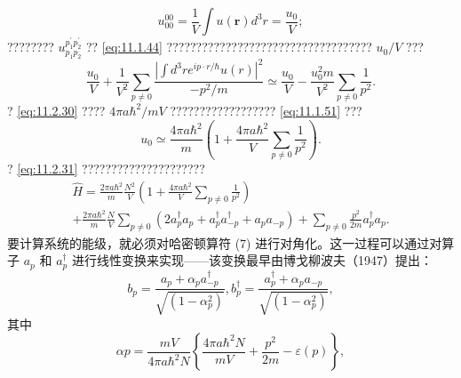 \begin{equation}\tag{11.2.29}\label{eq:11.2.29}
u _ { 00 } ^{00} = \frac { 1 } { V } \int u ( \mathbf { r } ) d ^{3} r = \frac { u _ { 0 } } { V } ;
\end{equation}
???????? \(u_{p_{1}p_{2}}^{p_{1}^{\prime}p_{2}^{\prime}}\) ?? \autoref{eq:11.1.44} ??????????????????????????????????? \(u_{0}/V\) ???
\begin{equation}\tag{11.2.30}\label{eq:11.2.30}
\frac { u _ { 0 } } { V } + \frac { 1 } { V ^{2} } \sum _ { p \neq 0 } \frac { | \int d ^{3} r e ^{i p \cdot r / \hbar} u ( r ) | ^{2} } { - p ^{2} / m } \simeq \frac { u _ { 0 } } { V } - \frac { u _ { 0 } ^{2} m } { V ^{2} } \sum _ { p \neq 0 } \frac { 1 } { p ^{2} } .
\end{equation}
? \autoref{eq:11.2.30} ???? \(4\pi a\hbar^{2}/mV\) ?????????????????? \autoref{eq:11.1.51} ???
\begin{equation}\tag{11.2.31}\label{eq:11.2.31}
u _ { 0 } \simeq \frac { 4 \pi a \hbar ^{2} } { m } \left( 1 + \frac { 4 \pi a \hbar ^{2} } { V } \sum _ { p \neq 0 } \frac { 1 } { p ^{2} } \right) .
\end{equation}
? \autoref{eq:11.2.31} ?????????????????????
\begin{equation}\tag{11.2.32}\label{eq:11.2.32}
\begin{array}{r} { \hat { H } = \frac { 2 \pi a \hbar ^{2} } { m } \frac { N ^{2} } { V } \left( 1 + \frac { 4 \pi a \hbar ^{2} } { V } \sum _ { p \neq 0 } \frac { 1 } { p ^{2} } \right) } \\{ + \frac { 2 \pi a \hbar ^{2} } { m } \frac { N } { V } \sum _ { p \neq 0 } ( 2 a _ { p } ^{\dagger} a _ { p } + a _ { p } ^{\dagger} a _ { - p } ^{\dagger} + a _ { p } a _ { - p } ) + \sum _ { p \neq 0 } \frac { p ^{2} } { 2 m } a _ { p } ^{\dagger} a _ { p } . } \end{array}
\end{equation}
要计算系统的能级，就必须对哈密顿算符 (7) 进行对角化。这一过程可以通过对算子 \(a_{p}\) 和 \(a_{p}^{\dagger}\) 进行线性变换来实现——该变换最早由博戈柳波夫（1947）提出：
\begin{equation}\tag{11.2.33}\label{eq:11.2.33}
b _ { p } = \frac { a _ { p } + \alpha _ { p } a _ { - p } ^{\dagger} } { \sqrt { ( 1 - \alpha _ { p } ^{2} ) } } ,  b _ { p } ^{\dagger} = \frac { a _ { p } ^{\dagger} + \alpha _ { p } a _ { - p } } { \sqrt { ( 1 - \alpha _ { p } ^{2} ) } } ,
\end{equation}
其中
\begin{equation}\tag{11.2.34}\label{eq:11.2.34}
\alpha p = \frac { m V } { 4 \pi a \hbar ^{2} N } \left\{ \frac { 4 \pi a \hbar ^{2} N } { m V } + \frac { p ^{2} } { 2 m } - \varepsilon ( p ) \right\} ,
\end{equation}
